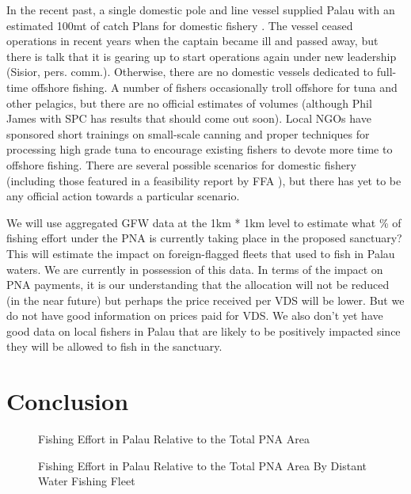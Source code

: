 \documentclass[11pt,english]{article}
\begin{document}
In the recent past, a single domestic pole and line vessel supplied Palau with an estimated 100mt of catch Plans for domestic fishery \citep{Gillett2016}. The vessel ceased operations in recent years when the captain became ill and passed away, but there is talk that it is gearing up to start operations again under new leadership (Sisior, pers. comm.). Otherwise, there are no domestic vessels dedicated to full-time offshore fishing. A number of fishers occasionally troll offshore for tuna and other pelagics, but there are no official estimates of volumes (although Phil James with SPC has results that should come out soon). 
Local NGOs have sponsored short trainings on small-scale canning and proper techniques for processing high grade tuna to encourage existing fishers to devote more time to offshore fishing. There are several possible scenarios for domestic fishery (including those featured in a feasibility report by FFA \citep{Skirtun2017}), but there has yet to be any official action towards a particular scenario. 
 

We will use aggregated GFW data at the 1km * 1km level to estimate what \% of fishing effort under the PNA is currently taking place in the proposed sanctuary? This will estimate the impact on foreign-flagged fleets that used to fish in Palau waters. We are currently in possession of this data. In terms of the impact on PNA payments, it is our understanding that the allocation will not be reduced (in the near future) but perhaps the price received per VDS will be lower. But we do not have good information on prices paid for VDS. We also don’t yet have good data on local fishers in Palau that are likely to be positively impacted since they will be allowed to fish in the sanctuary. 

\section{Conclusion}\label{conclude}

\begin{figure}[h]
	\caption{Fishing Effort in Palau Relative to the Total PNA Area}
\end{figure}

\begin{figure}[h]
	\caption{Fishing Effort in Palau Relative to the Total PNA Area By Distant Water Fishing Fleet}
\end{figure}
\end{document}
